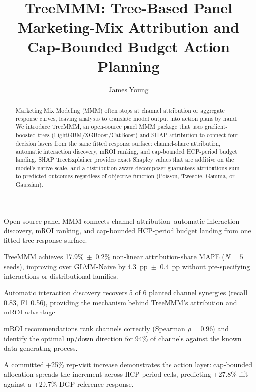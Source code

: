 \documentclass[review,12pt]{elsarticle}
\begin{document}
\begin{frontmatter}

\title{TreeMMM: Tree-Based Panel Marketing-Mix Attribution and
       Cap-Bounded Budget Action Planning}

\author[yd]{James Young}

\begin{highlights}
\item Open-source panel MMM connects channel attribution, automatic interaction
      discovery, mROI ranking, and cap-bounded HCP-period budget landing from
      one fitted tree response surface.
\item TreeMMM achieves 17.9\%~$\pm$~0.2\% non-linear attribution-share MAPE
      ($N{=}5$ seeds), improving over GLMM-Naive by 4.3~pp~$\pm$~0.4~pp
      without pre-specifying interactions or distributional families.
\item Automatic interaction discovery recovers 5 of 6 planted channel synergies
      (recall 0.83, F1 0.56), providing the mechanism behind TreeMMM's
      attribution and mROI advantage.
\item mROI recommendations rank channels correctly (Spearman $\rho = 0.96$)
      and identify the optimal up/down direction for 94\% of channels against
      the known data-generating process.
\item A committed +25\% rep-visit increase demonstrates the action layer:
      cap-bounded allocation spreads the increment across HCP-period cells,
      predicting +27.8\% lift against a +20.7\% DGP-reference response.
\end{highlights}

\begin{abstract}
Marketing Mix Modeling (MMM) often stops at channel attribution or aggregate
response curves, leaving analysts to translate model output into action plans
by hand. We introduce TreeMMM, an open-source panel MMM package that uses
gradient-boosted trees (LightGBM/XGBoost/CatBoost)
\cite{ke2017lightgbm,chen2016xgboost,prokhorenkova2018catboost} and SHAP attribution to
connect four decision layers from the same fitted response surface:
channel-share attribution, automatic interaction discovery, mROI ranking, and
cap-bounded HCP-period budget landing. SHAP TreeExplainer provides exact
Shapley values that are additive on the model's native scale, and a
distribution-aware decomposer guarantees attributions sum to predicted outcomes
regardless of objective function (Poisson, Tweedie, Gamma, or Gaussian).


\end{abstract}
\end{frontmatter}
\end{document}
